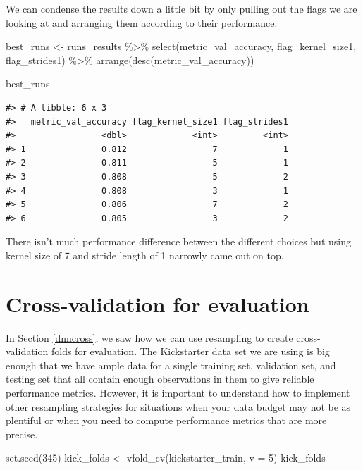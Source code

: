 \documentclass[
]{krantz}
\makeatletter
\newenvironment{Shaded}{\begin{snugshade}}{\end{snugshade}}
\newcommand{\AttributeTok}[1]{\textcolor[rgb]{0.77,0.63,0.00}{#1}}
\newcommand{\DecValTok}[1]{\textcolor[rgb]{0.00,0.00,0.81}{#1}}
\newcommand{\FunctionTok}[1]{\textcolor[rgb]{0.00,0.00,0.00}{#1}}
\newcommand{\NormalTok}[1]{#1}
\newcommand{\OtherTok}[1]{\textcolor[rgb]{0.56,0.35,0.01}{#1}}
\newcommand{\SpecialCharTok}[1]{\textcolor[rgb]{0.00,0.00,0.00}{#1}}
\newenvironment{kframe}{%
\medskip{}
\setlength{\fboxsep}{.8em}
 \def\at@end@of@kframe{}%
 \ifinner\ifhmode%
  \def\at@end@of@kframe{\end{minipage}}%
  \begin{minipage}{\columnwidth}%
 \fi\fi%
 \def\FrameCommand##1{\hskip\@totalleftmargin \hskip-\fboxsep
 \colorbox{shadecolor}{##1}\hskip-\fboxsep
     \hskip-\linewidth \hskip-\@totalleftmargin \hskip\columnwidth}%
 \MakeFramed {\advance\hsize-\width
   \@totalleftmargin\z@ \linewidth\hsize
   \@setminipage}}%
 {\par\unskip\endMakeFramed%
 \at@end@of@kframe}
\renewenvironment{Shaded}{\begin{kframe}}{\end{kframe}}
\makeatother
\begin{document}
We can condense the results down a little bit by only pulling out the flags we are looking at and arranging them according to their performance.

\begin{Shaded}
\begin{Highlighting}[]
\NormalTok{best\_runs }\OtherTok{\textless{}{-}}\NormalTok{ runs\_results }\SpecialCharTok{\%\textgreater{}\%}
  \FunctionTok{select}\NormalTok{(metric\_val\_accuracy, flag\_kernel\_size1, flag\_strides1) }\SpecialCharTok{\%\textgreater{}\%}
  \FunctionTok{arrange}\NormalTok{(}\FunctionTok{desc}\NormalTok{(metric\_val\_accuracy))}

\NormalTok{best\_runs}
\end{Highlighting}
\end{Shaded}

\begin{verbatim}
#> # A tibble: 6 x 3
#>   metric_val_accuracy flag_kernel_size1 flag_strides1
#>                 <dbl>             <int>         <int>
#> 1               0.812                 7             1
#> 2               0.811                 5             1
#> 3               0.808                 5             2
#> 4               0.808                 3             1
#> 5               0.806                 7             2
#> 6               0.805                 3             2
\end{verbatim}

There isn't much performance difference between the different choices but using kernel size of 7 and stride length of 1 narrowly came out on top.

\hypertarget{cross-validation-for-evaluation}{%
\section{Cross-validation for evaluation}\label{cross-validation-for-evaluation}}

In Section \ref{dnncross}, we saw how we can use resampling to create cross-validation folds for evaluation. The Kickstarter data set we are using is big enough that we have ample data for a single training set, validation set, and testing set that all contain enough observations in them to give reliable performance metrics. However, it is important to understand how to implement other resampling strategies for situations when your data budget may not be as plentiful or when you need to compute performance metrics that are more precise.

\begin{Shaded}
\begin{Highlighting}[]
\FunctionTok{set.seed}\NormalTok{(}\DecValTok{345}\NormalTok{)}
\NormalTok{kick\_folds }\OtherTok{\textless{}{-}} \FunctionTok{vfold\_cv}\NormalTok{(kickstarter\_train, }\AttributeTok{v =} \DecValTok{5}\NormalTok{)}
\NormalTok{kick\_folds}
\end{Highlighting}
\end{Shaded}
\end{document}

